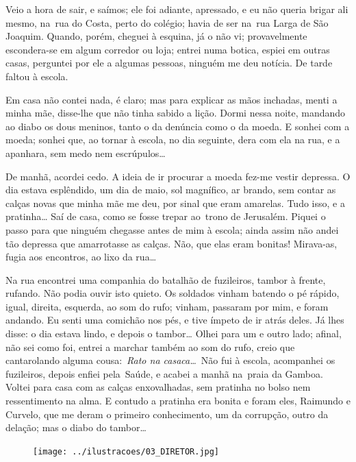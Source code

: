 Veio a hora de sair, e saímos; ele foi adiante, apressado, e eu não
queria brigar ali mesmo, na~rua do Costa, perto do colégio; havia de ser
na~rua Larga de São Joaquim. Quando, porém, cheguei à esquina, já o não
vi; provavelmente escondera-se em algum corredor ou loja; entrei numa
botica, espiei em outras casas, perguntei por ele a algumas pessoas,
ninguém me deu notícia. De tarde faltou à escola.

Em casa não contei nada, é claro; mas para explicar as mãos inchadas,
menti a minha mãe, disse-lhe que não tinha sabido a lição. Dormi nessa
noite, mandando ao diabo os dous meninos, tanto o da denúncia como o da
moeda. E sonhei com a moeda; sonhei que, ao tornar à escola, no dia
seguinte, dera com ela na rua, e a apanhara, sem medo nem escrúpulos\ldots{}

De manhã, acordei cedo. A ideia de ir procurar a moeda fez-me vestir
depressa. O dia estava esplêndido, um dia de maio, sol magnífico, ar
brando, sem contar as calças novas que minha mãe me deu, por sinal que
eram amarelas. Tudo isso, e a pratinha\ldots{} Saí de casa, como se fosse
trepar ao~trono de Jerusalém. Piquei o passo para que ninguém chegasse
antes de mim à escola; ainda assim não andei tão depressa que
amarrotasse as calças. Não, que elas eram bonitas! Mirava-as, fugia aos
encontros, ao lixo da rua\ldots{}

Na rua encontrei uma companhia do batalhão de fuzileiros, tambor à
frente, rufando. Não podia ouvir isto quieto. Os soldados vinham batendo
o pé rápido, igual, direita, esquerda, ao som do rufo; vinham, passaram
por mim, e foram andando. Eu senti uma comichão nos pés, e tive ímpeto
de ir atrás deles. Já lhes disse: o dia estava lindo, e depois o
tambor\ldots{} Olhei para um e outro lado; afinal, não sei como foi, entrei a
marchar também ao som do rufo, creio que cantarolando alguma
cousa:~\emph{Rato na casaca\ldots{}}~Não fui à escola, acompanhei os
fuzileiros, depois enfiei pela~Saúde, e acabei a manhã na~praia da
Gamboa. Voltei para casa com as calças enxovalhadas, sem pratinha no
bolso nem ressentimento na alma. E contudo a pratinha era bonita e foram
eles, Raimundo e Curvelo, que me deram o primeiro conhecimento, um da
corrupção, outro da delação; mas o diabo do tambor\ldots{}

\pagebreak
\thispagestyle{empty}
\begin{figure}
\vspace*{-.5cm}
\hspace*{-2.3cm}\texttt{[image: ../ilustracoes/03\_DIRETOR.jpg]}
\end{figure}
\pagebreak

